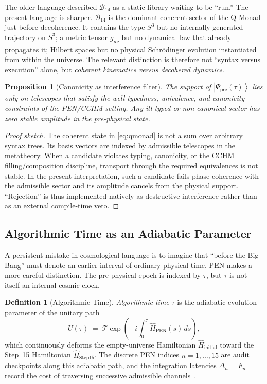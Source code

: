 \documentclass[11pt,a4paper]{article}
\theoremstyle{plain}
\newtheorem{proposition}[theorem]{Proposition}
\theoremstyle{definition}
\newtheorem{definition}[theorem]{Definition}
\theoremstyle{remark}
\newcommand{\B}{\mathcal{B}}
\providecommand{\ket}[1]{\left|#1\right\rangle}
\begin{document}
The older language described $\B_{14}$ as a static library waiting to be ``run.''
The present language is sharper.
$\B_{14}$ is the dominant coherent sector of the Q-Monad just before decoherence.
It contains the type $S^3$ but no internally generated trajectory on $S^3$; a metric tensor $g_{\mu\nu}$ but no dynamical law that already propagates it; Hilbert spaces but no physical Schr\"odinger evolution instantiated from within the universe.
The relevant distinction is therefore not ``syntax versus execution'' alone, but \emph{coherent kinematics versus decohered dynamics}.

\begin{proposition}[Canonicity as interference filter]
\label{prop:interference}
The support of $\ket{\Psi_{\mathrm{pre}}(\tau)}$ lies only on telescopes that satisfy the well-typedness, univalence, and canonicity constraints of the PEN/CCHM setting.
Any ill-typed or non-canonical sector has zero stable amplitude in the pre-physical state.
\end{proposition}

\begin{proof}[Proof sketch]
The coherent state in \eqref{eq:qmonad} is not a sum over arbitrary syntax trees.
Its basis vectors are indexed by admissible telescopes in the metatheory.
When a candidate violates typing, canonicity, or the CCHM filling/composition discipline, transport through the required equivalences is not stable.
In the present interpretation, such a candidate fails phase coherence with the admissible sector and its amplitude cancels from the physical support.
``Rejection'' is thus implemented natively as destructive interference rather than as an external compile-time veto.
\end{proof}

\subsection{Algorithmic Time as an Adiabatic Parameter}
\label{sec:two-clocks}

A persistent mistake in cosmological language is to imagine that ``before the Big Bang'' must denote an earlier interval of ordinary physical time.
PEN makes a more careful distinction.
The pre-physical epoch is indexed by $\tau$, but $\tau$ is not itself an internal cosmic clock.

\begin{definition}[Algorithmic Time]
\label{def:alg-time}
\emph{Algorithmic time} $\tau$ is the adiabatic evolution parameter of the unitary path
\begin{equation}
\label{eq:adiabatic}
    U(\tau)
    \;=\;
    \mathcal{T}\exp\!\left(
    -i\int_{0}^{\tau}\hat{H}_{\mathrm{PEN}}(s)\,ds
    \right),
\end{equation}
which continuously deforms the empty-universe Hamiltonian $\hat{H}_{\mathrm{initial}}$ toward the Step~15 Hamiltonian $\hat{H}_{\mathrm{Step15}}$.
The discrete PEN indices $n = 1,\dots,15$ are audit checkpoints along this adiabatic path, and the integration latencies $\Delta_n = F_n$ record the cost of traversing successive admissible channels~\cite{pen}.
\end{definition}
\end{document}
